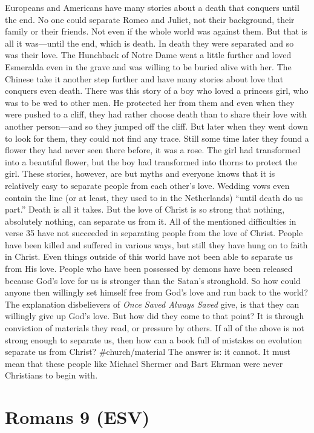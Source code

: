 Europeans and Americans have many stories about a death that conquers
until the end. No one could separate Romeo and Juliet, not their
background, their family or their friends. Not even if the whole world
was against them. But that is all it was---until the end, which is
death. In death they were separated and so was their love. The Hunchback
of Notre Dame went a little further and loved Esmeralda even in the
grave and was willing to be buried alive with her. The Chinese take it
another step further and have many stories about love that conquers even
death. There was this story of a boy who loved a princess girl, who was
to be wed to other men. He protected her from them and even when they
were pushed to a cliff, they had rather choose death than to share their
love with another person---and so they jumped off the cliff. But later
when they went down to look for them, they could not find any trace.
Still some time later they found a flower they had never seen there
before, it was a rose. The girl had transformed into a beautiful flower,
but the boy had transformed into thorns to protect the girl. These
stories, however, are but myths and everyone knows that it is relatively
easy to separate people from each other's love. Wedding vows even
contain the line (or at least, they used to in the Netherlands) ``until
death do us part.'' Death is all it takes. But the love of Christ is so
strong that nothing, absolutely nothing, can separate us from it. All of
the mentioned difficulties in verse 35 have not succeeded in separating
people from the love of Christ. People have been killed and suffered in
various ways, but still they have hung on to faith in Christ. Even
things outside of this world have not been able to separate us from His
love. People who have been possessed by demons have been released
because God's love for us is stronger than the Satan's stronghold. So
how could anyone then willingly set himself free from God's love and run
back to the world? The explanation disbelievers of \emph{Once Saved
Always Saved} give, is that they can willingly give up God's love. But
how did they come to that point? It is through conviction of materials
they read, or pressure by others. If all of the above is not strong
enough to separate us, then how can a book full of mistakes on evolution
separate us from Christ? \#church/material The answer is: it cannot. It
must mean that these people like Michael Shermer and Bart Ehrman were
never Christians to begin with. 

\hypertarget{romans-9-esv}{%
\section{Romans 9 (ESV)}\label{romans-9-esv}}
\vspace{10.5cm}
